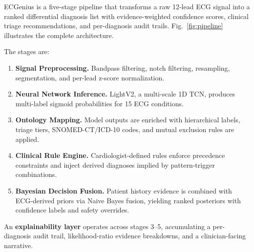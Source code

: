 \documentclass[journal]{IEEEtran}
\begin{document}
ECGenius is a five-stage pipeline that transforms a raw 12-lead ECG
signal into a ranked differential diagnosis list with evidence-weighted
confidence scores, clinical triage recommendations, and per-diagnosis
audit trails.
Fig.~\ref{fig:pipeline} illustrates the complete architecture.

The stages are:
\begin{enumerate}[leftmargin=*]
  \item \textbf{Signal Preprocessing.} Bandpass filtering, notch
        filtering, resampling, segmentation, and per-lead
        z-score normalization.
  \item \textbf{Neural Network Inference.} LightV2, a multi-scale
        1D TCN, produces multi-label sigmoid probabilities for 15
        ECG conditions.
  \item \textbf{Ontology Mapping.} Model outputs are enriched with
        hierarchical labels, triage tiers, SNOMED-CT/ICD-10 codes,
        and mutual exclusion rules are applied.
  \item \textbf{Clinical Rule Engine.} Cardiologist-defined rules
        enforce precedence constraints and inject derived diagnoses
        implied by pattern-trigger combinations.
  \item \textbf{Bayesian Decision Fusion.} Patient history evidence
        is combined with ECG-derived priors via Naive Bayes fusion,
        yielding ranked posteriors with confidence labels and safety
        overrides.
\end{enumerate}

An \textbf{explainability layer} operates across stages 3–5,
accumulating a per-diagnosis audit trail, likelihood-ratio evidence
breakdowns, and a clinician-facing narrative.
\end{document}
